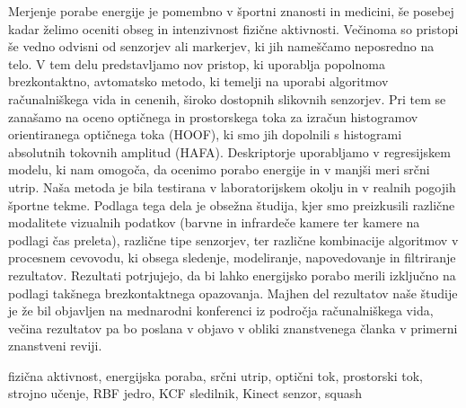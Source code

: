 \povzetek
Merjenje porabe energije je pomembno v športni znanosti in medicini, še posebej kadar želimo oceniti obseg in intenzivnost fizične aktivnosti. Večinoma so pristopi še vedno odvisni od senzorjev ali markerjev, ki jih nameščamo neposredno na telo. V tem delu predstavljamo nov pristop, ki uporablja popolnoma brezkontaktno, avtomatsko metodo, ki temelji na uporabi algoritmov računalniškega vida in cenenih, široko dostopnih slikovnih senzorjev. Pri tem se zanašamo na oceno optičnega in prostorskega toka za izračun histogramov orientiranega optičnega toka (HOOF), ki smo jih dopolnili s histogrami absolutnih tokovnih amplitud (HAFA). Deskriptorje uporabljamo v regresijskem modelu, ki nam omogoča, da ocenimo porabo energije in v manjši meri srčni utrip. Naša metoda je bila testirana v laboratorijskem okolju in v realnih pogojih športne tekme. Podlaga tega dela je obsežna študija, kjer smo preizkusili različne modalitete vizualnih podatkov (barvne in infrardeče kamere ter kamere na podlagi čas preleta), različne tipe senzorjev, ter različne kombinacije algoritmov v procesnem cevovodu, ki obsega sledenje, modeliranje, napovedovanje in filtriranje rezultatov.
Rezultati potrjujejo, da bi lahko energijsko porabo merili izključno na podlagi takšnega brezkontaktnega opazovanja. Majhen del rezultatov naše študije je že bil objavljen na mednarodni konferenci iz področja računalniškega vida, večina rezultatov pa bo poslana v objavo v obliki znanstvenega članka v primerni znanstveni reviji.

\kljucnebesede fizična aktivnost, energijska poraba, srčni utrip, optični tok, prostorski tok, strojno učenje, RBF jedro, KCF sledilnik, Kinect senzor, squash